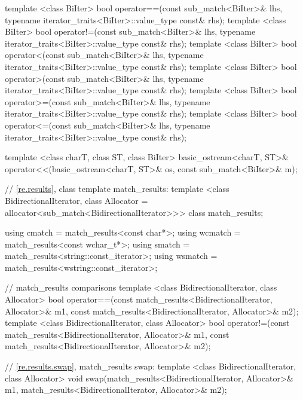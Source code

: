 \begin{codeblock}
{  template <class BiIter> 
    bool operator==(const sub_match<BiIter>& lhs, 
                    typename iterator_traits<BiIter>::value_type const& rhs); 
  template <class BiIter> 
    bool operator!=(const sub_match<BiIter>& lhs, 
                    typename iterator_traits<BiIter>::value_type const& rhs); 
  template <class BiIter> 
    bool operator<(const sub_match<BiIter>& lhs, 
                   typename iterator_traits<BiIter>::value_type const& rhs); 
  template <class BiIter> 
    bool operator>(const sub_match<BiIter>& lhs, 
                   typename iterator_traits<BiIter>::value_type const& rhs); 
  template <class BiIter> 
    bool operator>=(const sub_match<BiIter>& lhs, 
                    typename iterator_traits<BiIter>::value_type const& rhs); 
  template <class BiIter> 
    bool operator<=(const sub_match<BiIter>& lhs, 
                    typename iterator_traits<BiIter>::value_type const& rhs); 

  template <class charT, class ST, class BiIter>
    basic_ostream<charT, ST>&
    operator<<(basic_ostream<charT, ST>& os, const sub_match<BiIter>& m);

  // \ref{re.results}, class template match_results:
  template <class BidirectionalIterator,
            class Allocator = allocator<sub_match<BidirectionalIterator>>>
    class match_results;

  using cmatch  = match_results<const char*>;
  using wcmatch = match_results<const wchar_t*>;
  using smatch  = match_results<string::const_iterator>;
  using wsmatch = match_results<wstring::const_iterator>;

  // match_results comparisons
  template <class BidirectionalIterator, class Allocator>
    bool operator==(const match_results<BidirectionalIterator, Allocator>& m1,
                    const match_results<BidirectionalIterator, Allocator>& m2);
  template <class BidirectionalIterator, class Allocator>
    bool operator!=(const match_results<BidirectionalIterator, Allocator>& m1,
                    const match_results<BidirectionalIterator, Allocator>& m2);

  // \ref{re.results.swap}, match_results swap:
  template <class BidirectionalIterator, class Allocator>
    void swap(match_results<BidirectionalIterator, Allocator>& m1,
              match_results<BidirectionalIterator, Allocator>& m2);

}
\end{codeblock}
